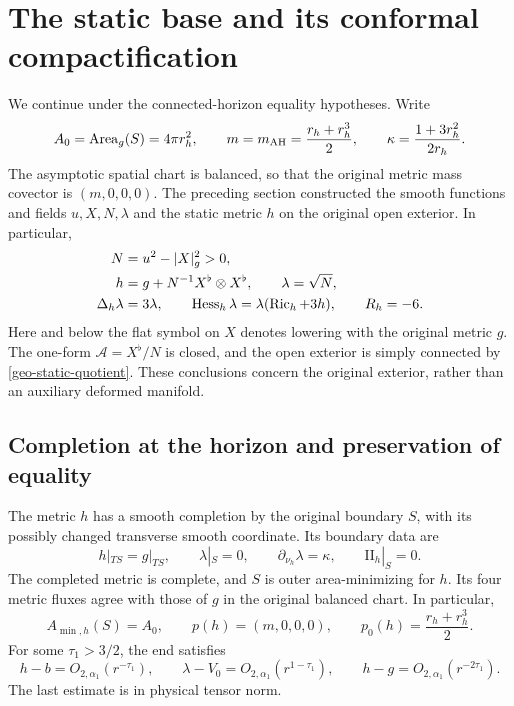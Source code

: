 \section{The static base and its conformal compactification}
\label{st-section}

We continue under the connected-horizon equality hypotheses.  Write
\[
 A_0=\operatorname{Area}_g(S)=4\pi r_h^2,
 \qquad m=m_{\mathrm{AH}}=\frac{r_h+r_h^3}{2},
 \qquad \kappa=\frac{1+3r_h^2}{2r_h}.
\]
The asymptotic spatial chart is balanced, so that the original metric
mass covector is $(m,0,0,0)$.  The preceding section constructed the
smooth functions and fields $u,X,N,\lambda$ and the static metric $h$ on
the original open exterior.  In particular,
\begin{equation}
 \begin{split}
 N&=u^2-|X|_g^2>0,\\
 h&=g+N^{-1}X^\flat\otimes X^\flat,
 \qquad \lambda=\sqrt N,\\
 \Delta_h\lambda&=3\lambda,
 \qquad \operatorname{Hess}_h\lambda=\lambda(\operatorname{Ric}_h+3h),
 \qquad R_h=-6.
 \end{split}
 \label{st-static-equations}
\end{equation}
Here and below the flat symbol on $X$ denotes lowering with the
original metric $g$.  The one-form $\mathcal A=X^\flat/N$ is closed,
and the open exterior is simply connected by
\cref{geo-static-quotient}.  These conclusions concern the original
exterior, rather than an auxiliary deformed manifold.

\subsection{Completion at the horizon and preservation of equality}

\begin{proposition}
\label{st-base-equality}
The metric $h$ has a smooth completion by the original boundary $S$,
with its possibly changed transverse smooth coordinate.  Its boundary
data are
\begin{equation}
 h|_{TS}=g|_{TS},\qquad
 \lambda|_S=0,\qquad
 \partial_{\nu_h}\lambda=\kappa,\qquad
 \mathrm{II}_h|_S=0.
 \label{st-base-boundary}
\end{equation}
The completed metric is complete, and $S$ is outer area-minimizing for
$h$.  Its four metric fluxes agree with those of $g$ in the original
balanced chart.  In particular,
\begin{equation}
 A_{\min,h}(S)=A_0,
 \qquad p(h)=(m,0,0,0),
 \qquad p_0(h)=\frac{r_h+r_h^3}{2}.
 \label{st-base-equality-data}
\end{equation}
For some $\tau_1>3/2$, the end satisfies
\begin{equation}
 h-b=O_{2,\alpha_1}(r^{-\tau_1}),\qquad
 \lambda-V_0=O_{2,\alpha_1}(r^{1-\tau_1}),\qquad
 h-g=O_{2,\alpha_1}(r^{-2\tau_1}).
 \label{st-base-decay}
\end{equation}
The last estimate is in physical tensor norm.
\end{proposition}

